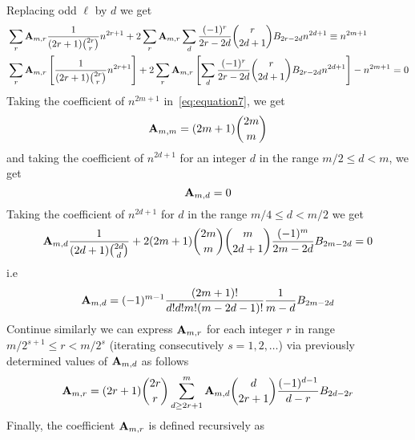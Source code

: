 Replacing odd $\ell$ by $d$ we get
\begin{equation}
    \begin{split}
        &\sum_{r} {\mathbf{A}} \sb{m,r} \frac{1}{(2r+1) \binom{2r}r} n^{2r+1}
        + 2 \sum_{r} {\mathbf{A}} \sb{m,r} \sum_{d} \frac{(-1)^r}{2r-2d} \binom{r}{2d+1} {B}\sb{2r-2d} n^{2d+1}
        \equiv n^{2m+1} \\
        &\sum_{r} {\mathbf{A}} \sb{m,r} \left[ \frac{1}{(2r+1) \binom{2r}r} n^{2r+1} \right]
        + 2 \sum_{r} {\mathbf{A}} \sb{m,r} \left[ \sum_{d} \frac{(-1)^r}{2r-2d} \binom{r}{2d+1} {B}\sb{2r-2d} n^{2d+1} \right]
        - n^{2m+1} = 0
    \end{split}\label{eq:equation7}
\end{equation}
Taking the coefficient of $n^{2m+1}$ in~\eqref{eq:equation7}, we get
\begin{equation*}
    {\mathbf{A}} \sb{m,m} = (2m+1)\binom{2m}{m}
\end{equation*}
and taking the coefficient of $n^{2d+1}$ for an integer $d$ in the range $m/2 \leq d < m$, we get
\begin{equation*}
    {\mathbf{A}} \sb{m,d} = 0
\end{equation*}
Taking the coefficient of $n^{2d+1}$ for $d$ in the range $m/4 \leq d < m/2$ we get
\begin{equation*}
    {\mathbf{A}} \sb{m,d} \frac{1}{(2d+1) \binom{2d}{d}}
    +2 (2m+1) \binom{2m}{m}\binom{m}{2d+1} \frac{(-1)^m}{2m-2d} {B}\sb{2m-2d} = 0
\end{equation*}
i.e
\begin{equation*}
    {\mathbf{A}} \sb{m,d} = (-1)^{m-1} \frac{(2m+1)!}{d!d!m!(m-2d-1)!} \frac{1}{m-d} {B}\sb{2m-2d}
\end{equation*}
Continue similarly we can express ${\mathbf{A}} \sb{m,r}$ for each integer $r$ in range $m/2^{s+1}\leq r < m/2^s$
(iterating consecutively $s=1,2,\ldots$) via previously determined values of ${\mathbf{A}} \sb{m,d}$ as follows
\begin{equation*}
    {\mathbf{A}} \sb{m,r} =
    (2r+1) \binom{2r}{r} \sum_{d \geq 2r+1}^{m} {\mathbf{A}} \sb{m,d} \binom{d}{2r+1} \frac{(-1)^{d-1}}{d-r}
    {B}\sb{2d-2r}
\end{equation*}
Finally, the coefficient ${\mathbf{A}} \sb{m,r}$ is defined recursively as
